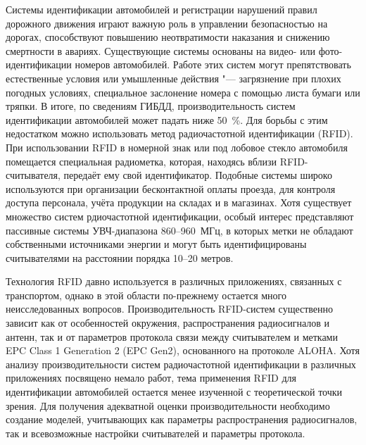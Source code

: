 Системы идентификации автомобилей и регистрации нарушений правил дорожного движения играют важную роль в управлении безопасностью на дорогах, способствуют повышению неотвратимости наказания и снижению смертности в авариях. Существующие системы основаны на видео- или фото-идентификации номеров автомобилей. Работе этих систем могут препятствовать естественные условия или умышленные действия "--- загрязнение при плохих погодных условиях, специальное заслонение номера с помощью листа бумаги или тряпки. В итоге, по сведениям ГИБДД, производительность систем идентификации автомобилей может падать ниже 50~\%. Для борьбы с этим недостатком можно использовать метод радиочастотной идентификации (RFID). При использовании RFID в номерной знак или под лобовое стекло автомобиля помещается специальная радиометка, которая, находясь вблизи RFID-считывателя, передаёт ему свой идентификатор. Подобные системы широко используются при организации бесконтактной оплаты проезда, для контроля доступа персонала, учёта продукции на складах и в магазинах. Хотя существует множество систем рдиочастотной идентификации, особый интерес представляют пассивные системы УВЧ-диапазона 860--960~МГц, в которых метки не обладают собственными источниками энергии и могут быть идентифицированы считывателями на расстоянии порядка 10--20 метров.

Технология RFID давно используется в различных приложениях, связанных с транспортом, однако в этой области по-прежнему остается много неисследованных вопросов. Производительность RFID-систем существенно зависит как от особенностей окружения, распространения радиосигналов и антенн, так и от параметров протокола связи между считывателем и метками EPC Class 1 Generation 2 (EPC Gen2), основанного на протоколе ALOHA. Хотя анализу производительности систем радиочастотной идентификации в различных приложениях посвящено немало работ, тема применения RFID для идентификации автомобилей остается менее изученной с теоретической точки зрения. Для получения адекватной оценки производительности необходимо создание моделей, учитывающих как параметры распространения радиосигналов, так и всевозможные настройки считывателей и параметры протокола.

